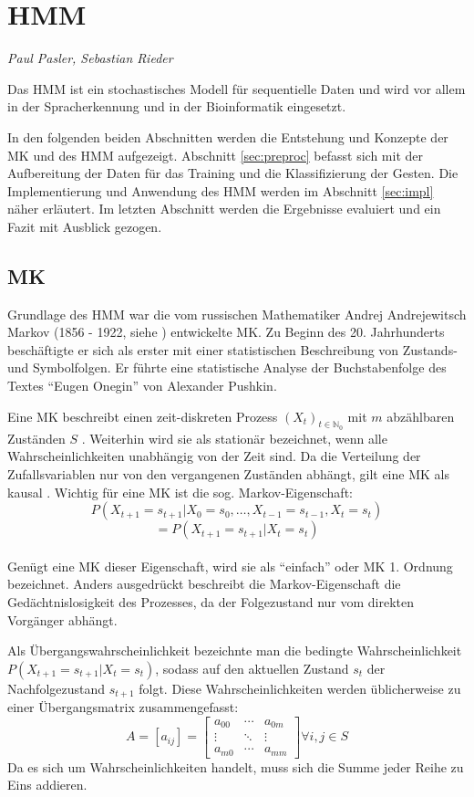 ﻿\section{\acl{HMM}}
\label{mainsec:hmm}
\textit{Paul Pasler, Sebastian Rieder}

Das \acl{HMM} ist ein stochastisches Modell für sequentielle Daten und wird vor allem in der Spracherkennung und in der Bioinformatik eingesetzt.

In den folgenden beiden Abschnitten werden die Entstehung und Konzepte der \acl{MK} und des \acl{HMM} aufgezeigt.
Abschnitt \ref{sec:preproc} befasst sich mit der Aufbereitung der Daten für das Training und die Klassifizierung der Gesten.
Die Implementierung und Anwendung des \acl{HMM} werden im Abschnitt \ref{sec:impl} näher erläutert. Im letzten Abschnitt werden die Ergebnisse 
evaluiert und ein Fazit mit Ausblick gezogen.  
 
\subsection{\acl{MK}} \label{sec:chain}
Grundlage des \acl{HMM} war die vom russischen Mathematiker Andrej Andrejewitsch Markov 
(1856 - 1922, siehe \cite{markov1913}) entwickelte \acl{MK}. Zu Beginn des
20. Jahrhunderts beschäftigte er sich als erster mit einer statistischen Beschreibung von Zustands- und Symbolfolgen. 
Er führte eine statistische Analyse der Buchstabenfolge des Textes ``Eugen Onegin'' von Alexander 
Pushkin.

Eine \acl{MK} beschreibt einen zeit-diskreten Prozess \((X_t)_{t\in\mathbb{N}_0}\) mit  \(m\) abzählbaren Zuständen \(S\) \cite{stochMod}.
Weiterhin wird sie als stationär bezeichnet, wenn alle Wahrscheinlichkeiten unabhängig von der Zeit sind.
Da die Verteilung der Zufallsvariablen nur von den vergangenen Zuständen abhängt, gilt eine \acl{MK} als kausal \cite[48]{mmmFink}.
Wichtig für eine \acl{MK} ist die sog. Markov-Eigenschaft:
\[ P (X_{t+1} = s_{t+1} | X_0 = s_0, \ldots , X_{t-1} = s_{t-1}, X_{t} = s_{t}) \]
\[ = P ( X_{t+1} = s_{t+1} | X_{t} = s_{t} ) \] \\
Genügt eine \acl{MK} dieser Eigenschaft, wird sie als ``einfach'' oder \acl{MK} 1. Ordnung bezeichnet.
Anders ausgedrückt beschreibt die Markov-Eigenschaft die Gedächtnislosigkeit des Prozesses, da der Folgezustand nur vom direkten Vorgänger abhängt.

Als Übergangswahrscheinlichkeit bezeichnte man die bedingte Wahrscheinlichkeit \(P ( X_{t+1} = s_{t+1} | X_{t} = s_{t} ) \), sodass auf 
den aktuellen Zustand \( s_{t}\) der Nachfolgezustand \( s_{t+1}\) folgt. Diese Wahrscheinlichkeiten werden üblicherweise zu einer Übergangsmatrix zusammengefasst: 
\[ A = [a_{ij}] =
\begin {bmatrix} 
  a_{00}&\cdots&a_{0m} \\
  \vdots&\ddots&\vdots \\
  a_{m0}&\cdots&a_{mm}
 \end {bmatrix} \forall i, j \in S \]
Da es sich um Wahrscheinlichkeiten handelt, muss sich die Summe jeder Reihe zu Eins addieren. \\

